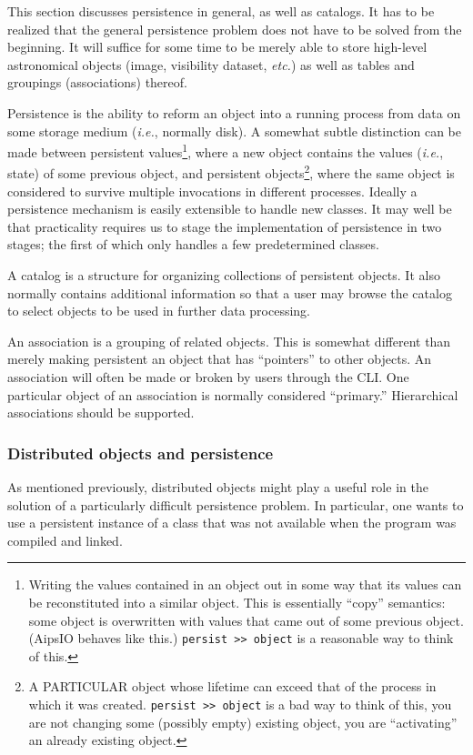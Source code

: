 This section discusses persistence in general, as well as catalogs. It
has to be realized that the general persistence problem does not have
to be solved from the beginning. It will suffice for some time to be
merely able to store high-level astronomical objects (image,
visibility dataset, {\em etc.}) as well as tables and groupings
(associations) thereof.

Persistence is the ability to reform an object into a running process
from data on some storage medium ({\em i.e.}, normally disk).  A
somewhat subtle distinction can be made between persistent
values\footnote{ Writing the values contained in an object out in some
way that its values can be reconstituted into a similar object.  This
is essentially ``copy'' semantics: some object is overwritten with
values that came out of some previous object. (AipsIO behaves like
this.) {\tt persist >> object} is a reasonable way to think of this.},
where a new object contains the values ({\em i.e.}, state) of some
previous object, and persistent objects\footnote{A PARTICULAR object
whose lifetime can exceed that of the process in which it was
created. {\tt persist >> object} is a bad way to think of this, you
are not changing some (possibly empty) existing object, you are
``activating'' an already existing object.}, where the same object is
considered to survive multiple invocations in different
processes. Ideally a persistence mechanism is easily extensible to
handle new classes. It may well be that practicality requires us to
stage the implementation of persistence in two stages; the first of
which only handles a few predetermined classes.

A catalog is a structure for organizing collections of persistent
objects. It also normally contains additional information so that a
user may browse the catalog to select objects to be used in further
data processing.

An association is a grouping of related objects. This is somewhat
different than merely making persistent an object that has
``pointers'' to other objects. An association will often be made or
broken by users through the CLI. One particular object of an
association is normally considered ``primary.'' Hierarchical
associations should be supported.

\subsubsection{Distributed objects and persistence}
As mentioned previously, distributed objects might play a useful role
in the solution of a particularly difficult persistence problem. In
particular, one wants to use a persistent instance of a class that was
not available when the program was compiled and linked.

